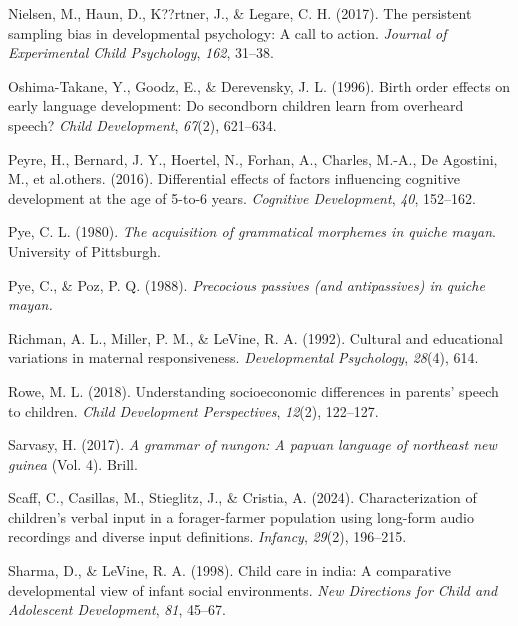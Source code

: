 \documentclass[
  man,floatsintext]{apa6}
\newlength{\cslhangindent}
\newlength{\cslentryspacingunit} %
\newenvironment{CSLReferences}[2] %
 {%
  \setlength{\parindent}{0pt}
  \ifodd #1
  \let\oldpar\par
  \def\par{\hangindent=\cslhangindent\oldpar}
  \fi
  \setlength{\parskip}{#2\cslentryspacingunit}
 }%
 {}
\begin{document}
\begin{CSLReferences}{1}{0}
\leavevmode{}%
Nielsen, M., Haun, D., K??rtner, J., \& Legare, C. H. (2017). The persistent sampling bias in developmental psychology: A call to action. \emph{Journal of Experimental Child Psychology}, \emph{162}, 31--38.

\leavevmode{}%
Oshima-Takane, Y., Goodz, E., \& Derevensky, J. L. (1996). Birth order effects on early language development: Do secondborn children learn from overheard speech? \emph{Child Development}, \emph{67}(2), 621--634.

\leavevmode{}%
Peyre, H., Bernard, J. Y., Hoertel, N., Forhan, A., Charles, M.-A., De Agostini, M., et al.others. (2016). Differential effects of factors influencing cognitive development at the age of 5-to-6 years. \emph{Cognitive Development}, \emph{40}, 152--162.

\leavevmode{}%
Pye, C. L. (1980). \emph{The acquisition of grammatical morphemes in quiche mayan}. University of Pittsburgh.

\leavevmode{}%
Pye, C., \& Poz, P. Q. (1988). \emph{Precocious passives (and antipassives) in quiche mayan.}

\leavevmode{}%
Richman, A. L., Miller, P. M., \& LeVine, R. A. (1992). Cultural and educational variations in maternal responsiveness. \emph{Developmental Psychology}, \emph{28}(4), 614.

\leavevmode{}%
Rowe, M. L. (2018). Understanding socioeconomic differences in parents' speech to children. \emph{Child Development Perspectives}, \emph{12}(2), 122--127.

\leavevmode{}%
Sarvasy, H. (2017). \emph{A grammar of nungon: A papuan language of northeast new guinea} (Vol. 4). Brill.

\leavevmode{}%
Scaff, C., Casillas, M., Stieglitz, J., \& Cristia, A. (2024). Characterization of children's verbal input in a forager-farmer population using long-form audio recordings and diverse input definitions. \emph{Infancy}, \emph{29}(2), 196--215.

\leavevmode{}%
Sharma, D., \& LeVine, R. A. (1998). Child care in india: A comparative developmental view of infant social environments. \emph{New Directions for Child and Adolescent Development}, \emph{81}, 45--67.


\end{CSLReferences}
\end{document}
